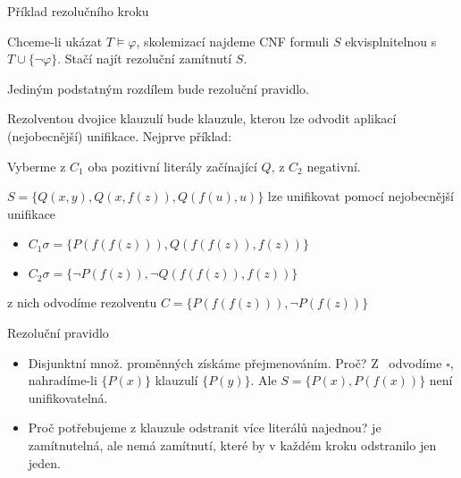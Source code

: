 \documentclass{beamer}
\begin{document}
\begin{frame}{Příklad rezolučního kroku}

    \pause
    Chceme-li ukázat $T\models\varphi$, skolemizací najdeme CNF formuli $S$ ekvisplnitelnou s $T\cup\{\neg\varphi\}$. Stačí najít rezoluční zamítnutí $S$.

    \pause
    Jediným podstatným rozdílem bude \alert{rezoluční pravidlo}. 

    \pause
    Rezolventou dvojice klauzulí bude klauzule, kterou lze odvodit aplikací \alert{(nejobecnější) unifikace}. Nejprve příklad:


    \pause

    \pause
    Vyberme z $C_1$ \alert{oba} pozitivní literály začínající $Q$, z $C_2$ negativní. 

    \pause
    $S=\{Q(x,y),Q(x,f(z)),Q(f(u),u)\}$ lze unifikovat pomocí nejobecnější unifikace 

    \pause
    \begin{itemize}
        \item $C_1\sigma=\{P(f(f(z))),Q(f(f(z)),f(z))\}$\pause
        \item $C_2\sigma=\{\neg P(f(z)),\neg Q(f(f(z)),f(z))\}$
    \end{itemize}

    \pause
    z nich odvodíme rezolventu $C=\{P(f(f(z))),\neg P(f(z))\}$
    
\end{frame}


\begin{frame}{Rezoluční pravidlo}

    \pause

    \medskip

    \pause
    \begin{itemize}
        \item Disjunktní množ. proměnných získáme přejmenováním. Proč? Z~ odvodíme $\square$, nahradíme-li $\{P(x)\}$ klauzulí $\{P(y)\}$. Ale $S=\{P(x),P(f(x))\}$ není unifikovatelná.\pause
    
        \item Proč potřebujeme z klauzule odstranit více literálů najednou?  je zamítnutelná, ale nemá zamítnutí, které by v každém kroku odstranilo jen jeden.  
    \end{itemize}
        
\end{frame}
\end{document}
